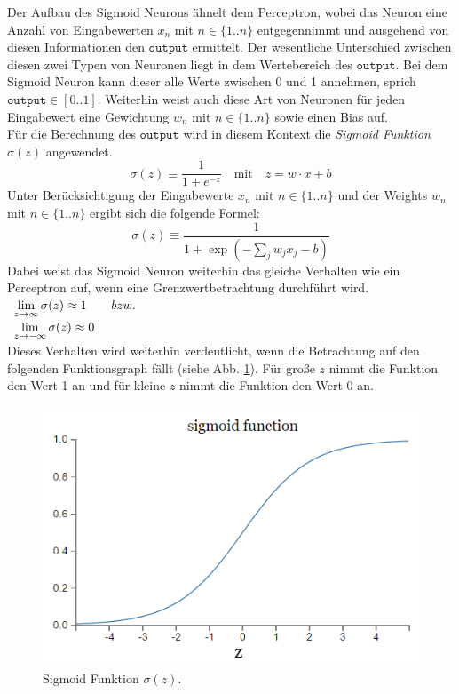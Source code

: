 \noindent
Der Aufbau des Sigmoid Neurons ähnelt dem Perceptron, wobei das Neuron eine Anzahl von Eingabewerten $x_n$ mit $n \in \{1 .. n\}$ entgegennimmt und ausgehend von diesen Informationen den $\mathtt{output}$ ermittelt. Der wesentliche Unterschied zwischen diesen zwei Typen von Neuronen liegt in dem Wertebereich des $\mathtt{output}$. Bei dem Sigmoid Neuron kann dieser alle Werte zwischen 0 und 1 annehmen, sprich $\mathtt{output} \in [0 .. 1]$. Weiterhin weist auch diese Art von Neuronen für jeden Eingabewert eine Gewichtung $w_n$ mit $n \in \{1 .. n\}$ sowie einen Bias auf. \\
Für die Berechnung des $\mathtt{output}$ wird in diesem Kontext die \textit{Sigmoid Funktion} $\sigma(z)$ angewendet.
\begin{equation}
	\sigma(z) \equiv \frac{1}{1+e^{-z}} \quad\mbox{mit}\quad z = w \cdot x + b
\end{equation}
Unter Berücksichtigung der Eingabewerte $x_n$ mit $n \in \{1 .. n\}$ und der Weights  $w_n$ mit $n \in \{1 .. n\}$ ergibt sich die folgende Formel:
\begin{equation}
	\sigma(z) \equiv \frac{1}{1+\exp(-\sum_j w_j x_j - b)}
\end{equation}
Dabei weist das Sigmoid Neuron weiterhin das gleiche Verhalten wie ein Perceptron auf, wenn eine Grenzwertbetrachtung durchführt wird. \\[0.2cm]
\hspace*{1.3cm}
$
\begin{array}[t]{lcll}
	\lim\limits_{z \to \infty}{\sigma(z)} \approx 1 \quad\quad bzw. \\[0.2cm]
	\lim\limits_{z \to -\infty}{ \sigma(z)} \approx 0
\end{array}
$
\\[0.2cm]
Dieses Verhalten wird weiterhin verdeutlicht, wenn die Betrachtung auf den folgenden Funktionsgraph fällt (siehe Abb. \ref{fig:sigmoid_plot}). Für große $z$ nimmt die Funktion den Wert 1 an und für kleine $z$ nimmt die Funktion den Wert 0 an.
\begin{figure}[hbt]
	\centering
	\includegraphics[scale=0.6]{Bilder/sigmoid_plot}
	\caption{Sigmoid Funktion $\sigma(z)$.} 
	\label{fig:sigmoid_plot} 
\end{figure}

